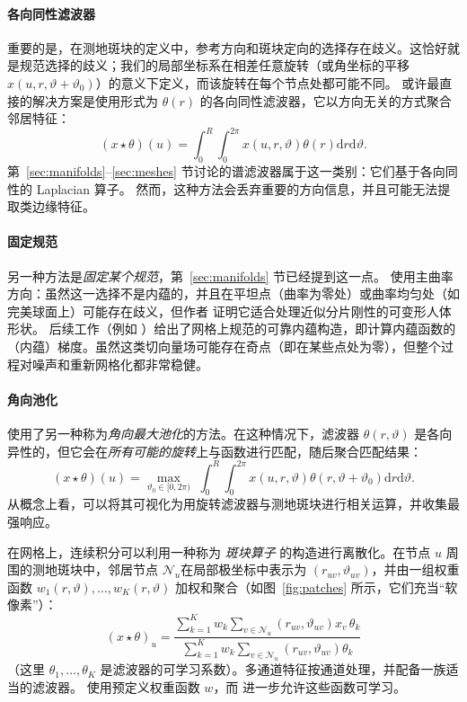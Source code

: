 \paragraph{各向同性滤波器}
重要的是，在测地斑块的定义中，参考方向和斑块定向的选择存在歧义。这恰好就是规范选择的歧义；我们的局部坐标系在相差任意旋转（或角坐标的平移 $x(u,r,\vartheta+\vartheta_0)$）的意义下定义，而该旋转在每个节点处都可能不同。
%
或许最直接的解决方案是使用形式为 $\theta(r)$ 的各向同性滤波器，它以方向无关的方式聚合邻居特征：
$$
(x\star \theta)(u) = \int_0^R \int_0^{2\pi} x(u,r,\vartheta) \theta(r) \mathrm{d}r \mathrm{d}\vartheta.
$$
第~\ref{sec:manifolds}--\ref{sec:meshes} 节讨论的谱滤波器属于这一类别：它们基于各向同性的 Laplacian 算子。
%
然而，这种方法会丢弃重要的方向信息，并且可能无法提取类边缘特征。


\paragraph{固定规范}
另一种方法是{\em 固定某个规范}，第~\ref{sec:manifolds} 节已经提到这一点。\cite{monti2017geometric} 使用主曲率方向：虽然这一选择不是内蕴的，并且在平坦点（曲率为零处）或曲率均匀处（如完美球面上）可能存在歧义，但作者
证明它适合处理近似分片刚性的可变形人体形状。
%
后续工作（例如 \cite{melzi2019gframes}）给出了网格上规范的可靠内蕴构造，即计算内蕴函数的（内蕴）梯度。虽然这类切向量场可能存在奇点（即在某些点处为零），但整个过程对噪声和重新网格化都非常稳健。


\paragraph{角向池化}
\cite{masci2015geodesic} 使用了另一种称为{\em 角向最大池化}的方法。在这种情况下，滤波器 $\theta(r,\vartheta)$ 是各向异性的，但它会在{\em 所有可能的旋转}上与函数进行匹配，随后聚合匹配结果：
$$
(x\star \theta)(u) = \max_{\vartheta_0 \in [0,2\pi) } \,\, \int_0^R \int_0^{2\pi} x(u,r,\vartheta) \theta(r,\vartheta+\vartheta_0) \mathrm{d}r \mathrm{d}\vartheta.
$$
从概念上看，可以将其可视化为用旋转滤波器与测地斑块进行相关运算，并收集最强响应。





在网格上，连续积分可以利用一种称为
{\em 斑块算子} \citep{masci2015geodesic} 的构造进行离散化。在节点 $u$ 周围的测地斑块中，邻居节点 $\mathcal{N}_u$在局部极坐标中表示为 $(r_{uv}, \vartheta_{uv})$，并由一组权重函数 $w_1(r,\vartheta), \hdots, w_K(r,\vartheta)$ 加权和聚合（如图~\ref{fig:patches} 所示，它们充当“软像素”）：
$$
(x\star \theta)_u = \frac{
\sum_{k=1}^K w_{k} \sum_{v\in \mathcal{N}_u} (r_{uv},\vartheta_{uv}) x_v \, \theta_k
}
{
\sum_{k=1}^K w_{k} \sum_{v\in \mathcal{N}_u} (r_{uv},\vartheta_{uv}) \theta_k
}
$$
  （这里%
  $\theta_1,\hdots, \theta_K$ 是滤波器的可学习系数）。多通道特征按通道处理，并配备一族适当的滤波器。
  \cite{masci2015geodesic,boscaini2016learning} 使用预定义权重函数 $w$，而 \cite{monti2017geometric} 进一步允许这些函数可学习。
%




